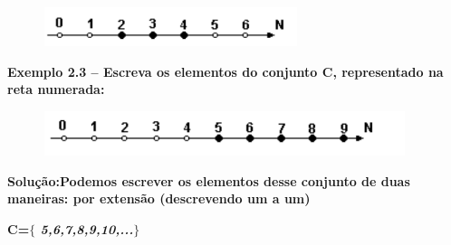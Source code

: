 \documentclass[12pt]{article}
\renewcommand{\_}{\kern-1.5pt\textunderscore\kern-1.5pt}
\begin{document}

\begin{figure}[H]
	\begin{Center}
		\includegraphics[width=2.93in,height=0.45in]{./media/image4.pdf}
	\end{Center}
\end{figure}



\tab \par

\begin{adjustwidth}{0.63in}{0.0in}
\textbf{Exemplo 2.3 – Escreva os elementos do conjunto C, representado na reta numerada:}\par

\end{adjustwidth}




\begin{figure}[H]
	\begin{Center}
		\includegraphics[width=4.17in,height=0.51in]{./media/image5.pdf}
	\end{Center}
\end{figure}



\tab \par

\begin{adjustwidth}{0.63in}{0.0in}
\textbf{Solução:\tab Podemos escrever os elementos desse conjunto de duas maneiras: por extensão (descrevendo um a um) }\par

\end{adjustwidth}

\begin{adjustwidth}{0.63in}{0.0in}
\tab  \textbf{C=$ \{ $ \textit{5,6,7,8,9,10,...$ \} $  }}\par

\end{adjustwidth}
\end{document}
